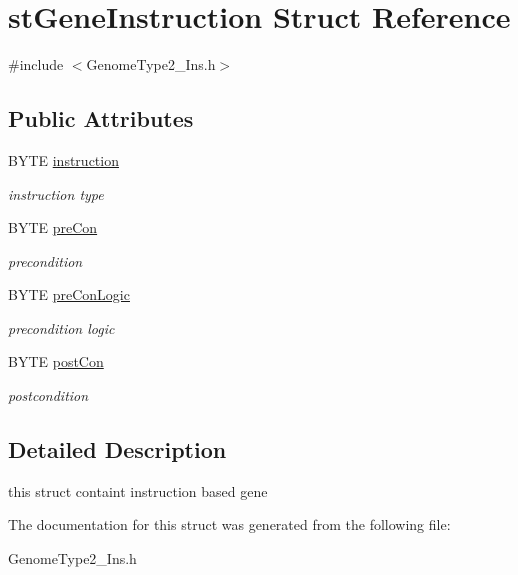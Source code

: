 \hypertarget{structstGeneInstruction}{
\section{stGeneInstruction Struct Reference}
\label{structstGeneInstruction}
}


{\ttfamily \#include $<$GenomeType2\_\-Ins.h$>$}\subsection*{Public Attributes}
\begin{DoxyCompactItemize}
\item 
\hypertarget{structstGeneInstruction_a1f1e550e337dc45eede18db27f2bb592}{
BYTE \hyperlink{structstGeneInstruction_a1f1e550e337dc45eede18db27f2bb592}{instruction}}
\label{structstGeneInstruction_a1f1e550e337dc45eede18db27f2bb592}

\begin{DoxyCompactList}\small\item\em instruction type \item\end{DoxyCompactList}\item 
\hypertarget{structstGeneInstruction_a86d587866013ba5eb5f49c553cb702ee}{
BYTE \hyperlink{structstGeneInstruction_a86d587866013ba5eb5f49c553cb702ee}{preCon}}
\label{structstGeneInstruction_a86d587866013ba5eb5f49c553cb702ee}

\begin{DoxyCompactList}\small\item\em precondition \item\end{DoxyCompactList}\item 
\hypertarget{structstGeneInstruction_a970bf945fbec7a0accc4b5a4739ab447}{
BYTE \hyperlink{structstGeneInstruction_a970bf945fbec7a0accc4b5a4739ab447}{preConLogic}}
\label{structstGeneInstruction_a970bf945fbec7a0accc4b5a4739ab447}

\begin{DoxyCompactList}\small\item\em precondition logic \item\end{DoxyCompactList}\item 
\hypertarget{structstGeneInstruction_acf8c8774285374e62f037ee2980b95ae}{
BYTE \hyperlink{structstGeneInstruction_acf8c8774285374e62f037ee2980b95ae}{postCon}}
\label{structstGeneInstruction_acf8c8774285374e62f037ee2980b95ae}

\begin{DoxyCompactList}\small\item\em postcondition \item\end{DoxyCompactList}\end{DoxyCompactItemize}


\subsection{Detailed Description}
this struct containt instruction based gene 

The documentation for this struct was generated from the following file:\begin{DoxyCompactItemize}
\item 
GenomeType2\_\-Ins.h\end{DoxyCompactItemize}

